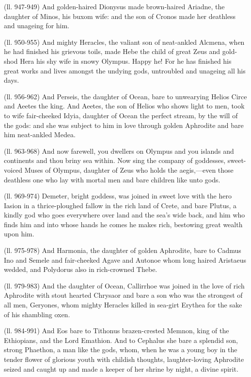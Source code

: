 (ll. 947-949) And golden-haired Dionysus made brown-haired Ariadne, the
daughter of Minos, his buxom wife: and the son of Cronos made her deathless and
unageing for him.

(ll. 950-955) And mighty Heracles, the valiant son of neat-ankled Alcmena, when
he had finished his grievous toils, made Hebe the child of great Zeus and
gold-shod Hera his shy wife in snowy Olympus. Happy he! For he has finished his
great works and lives amongst the undying gods, untroubled and unageing all his
days.

(ll. 956-962) And Perseis, the daughter of Ocean, bare to unwearying Helios
Circe and Aeetes the king. And Aeetes, the son of Helios who shows light to
men, took to wife fair-cheeked Idyia, daughter of Ocean the perfect stream, by
the will of the gods: and she was subject to him in love through golden
Aphrodite and bare him neat-ankled Medea.

(ll. 963-968) And now farewell, you dwellers on Olympus and you islands and
continents and thou briny sea within. Now sing the company of goddesses,
sweet-voiced Muses of Olympus, daughter of Zeus who holds the aegis,—even
those deathless one who lay with mortal men and bare children like unto gods.

(ll. 969-974) Demeter, bright goddess, was joined in sweet love with the hero
Iasion in a thrice-ploughed fallow in the rich land of Crete, and bare Plutus,
a kindly god who goes everywhere over land and the sea’s wide back, and
him who finds him and into whose hands he comes he makes rich, bestowing great
wealth upon him.

(ll. 975-978) And Harmonia, the daughter of golden Aphrodite, bare to Cadmus
Ino and Semele and fair-cheeked Agave and Autonoe whom long haired Aristaeus
wedded, and Polydorus also in rich-crowned Thebe.

(ll. 979-983) And the daughter of Ocean, Callirrhoe was joined in the love of
rich Aphrodite with stout hearted Chrysaor and bare a son who was the strongest
of all men, Geryones, whom mighty Heracles killed in sea-girt Erythea for the
sake of his shambling oxen.

(ll. 984-991) And Eos bare to Tithonus brazen-crested Memnon, king of the
Ethiopians, and the Lord Emathion. And to Cephalus she bare a splendid son,
strong Phaethon, a man like the gods, whom, when he was a young boy in the
tender flower of glorious youth with childish thoughts, laughter-loving
Aphrodite seized and caught up and made a keeper of her shrine by night, a
divine spirit.

